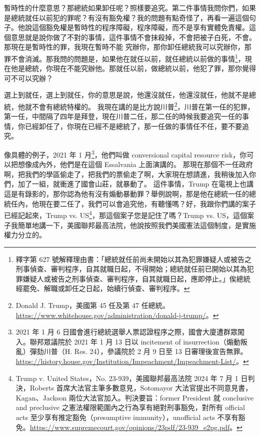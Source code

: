 \hypertarget{c11:cue:141}{}暫時性的什麼意思？那總統如果卸任呢？照樣要追究。第二件事情我問你們，如果是總統就任以前犯的罪呢？有沒有豁免權？我的問題有點奇怪了，再看一遍這個句子。他說這個豁免權是暫時性的程序障礙，程序障礙，而不是享有實體免責權。這個意思就是說你做了不對的事情，這件事情不會抹殺掉，不會把被子白死，不會。那現在是暫時性的罪，我現在暫時不能
\hypertarget{c11:cue:142}{}究辦你，那你卸任總統我可以究辦你，那罪不會消滅。那我問的問題是，如果他在就任以前，就任總統以前做的事情\footnote{釋字第 627 號解釋理由書：「總統就任前尚未開始以其為犯罪嫌疑人或被告之刑事偵查、審判程序，自其就職日起，不得開始；總統就任前已開始以其為犯罪嫌疑人或被告之刑事偵查、審判程序，自其就職日起，應即停止。」俟總統經罷免、解職或卸任之日起，始續行偵查、審判程序。}，現在他是總統，你現在不能究辦他。那就任以前，做總統以前，他犯了罪，那你覺得可不可以究辦？

\hypertarget{c11:cue:143}{}選上到就任，選上到就任，你的意思是說，他還沒就任，他還沒就任，他就不是總統，他就不會有總統特權的。
\hypertarget{c11:cue:144}{}我現在講的是比方說川普\footnote{Donald J. Trump，美國第 45 任及第 47 任總統。\url{https://www.whitehouse.gov/administration/donald-j-trump/}。}，川普在第一任的犯罪，第一任，中間隔了四年是拜登，現在川普二任，那二任的時候我要追究一任的事情，你已經卸任了，你現在已經不是總統了，那一任做的事情任不任，要不要追究。

\hypertarget{c11:cue:145}{}像具體的例子，2021 年 1 月\footnote{2021 年 1 月 6 日國會進行總統選舉人票認證程序之際，國會大廈遭群眾闖入。聯邦眾議院於 2021 年 1 月 13 日以 incitement of insurrection（煽動叛亂）彈劾川普（H. Res. 24），參議院於 2 月 9 日至 13 日審理後宣告無罪。\url{https://history.house.gov/Institution/Impeachment/Impeachment-List/}。}，他們叫做 conversional capital resource risk，你可以把想像成內外，他們是在這個 Essalvania 上面演講的。
\hypertarget{c11:cue:146}{}那現在那個不一任政府啊，把我們的學區偷走了，把我們的票偷走了啊，大家現在想請進，我稍後加入你們，加了一組，就衝進了國會山莊，就暴動了。
\hypertarget{c11:cue:147}{}這件事情，Trump 在電視上也講這是有錄影的，那你認為他有沒有煽動暴動罪？舉例說啊，那是他在總統一任的總統任內，他現在要二任了，我們可以會追究他，有聽懂嗎？好，我跟你們講的案子已經記起來，Trump vs. US\footnote{Trump v. United States，No. 23-939，美國聯邦最高法院 2024 年 7 月 1 日判決，Roberts 首席大法官主筆多數意見，Sotomayor 大法官提出不同意見書，Kagan、Jackson 兩位大法官加入。判決要旨：former President 就 conclusive and preclusive 之憲法權限範圍內之行為享有絕對刑事豁免，對所有 official acts 至少享有推定豁免（presumptive immunity），unofficial acts 不享有豁免。\url{https://www.supremecourt.gov/opinions/23pdf/23-939_e2pg.pdf}。}，那這個案子您是記住了嗎？Trump vs. US，這個案子我簡單地講一下，美國聯邦最高法院，他說按照我們美國憲法這個制度，是實施權力分立的。

